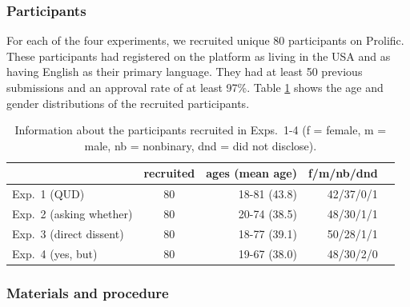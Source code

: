 \documentclass[times,linguex,xcolor]{glossa}
\begin{document}
  \subsubsection{Participants}

  For each of the four experiments, we recruited unique 80 participants on Prolific. These participants had registered on the platform as living in the USA and as having English as their primary language. They had at least 50 previous submissions and an approval rate of at least 97\%.  Table \ref{t:recruited} shows the age and gender distributions of the recruited participants.

  \begin{table}[h!]
  \centering
  \begin{tabular}{l | c | r r r }
              & recruited & ages (mean age) & f/m/nb/dnd \\ \hline
  Exp.~1 (QUD) & 80 & 18-81 (43.8) & 42/37/0/1  \\
  Exp.~2 (asking whether) & 80 & 20-74 (38.5)  & 48/30/1/1  \\
  Exp.~3 (direct dissent) & 80 & 18-77 (39.1) & 50/28/1/1  \\
  Exp.~4 (yes, but) &80 & 19-67 (38.0)  & 48/30/2/0 &  \\
  \hline
  \end{tabular}

  \caption{Information about the participants recruited in Exps.~1-4 (f = female, m = male, nb = nonbinary, dnd = did not disclose).}\label{t:recruited}
  \end{table}

  \subsubsection{Materials and procedure}
  
\end{document}
